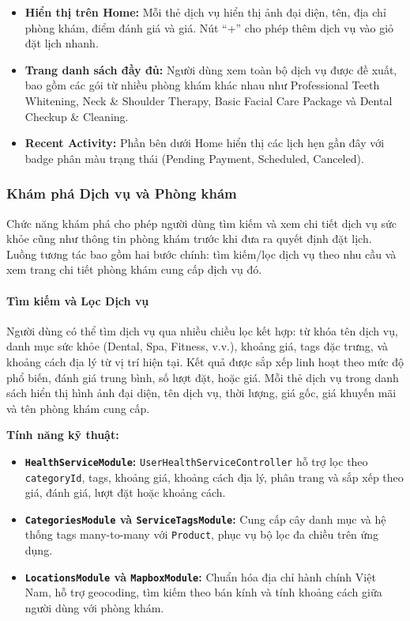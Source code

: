 \begin{itemize}
    \item \textbf{Hiển thị trên Home:} Mỗi thẻ dịch vụ hiển thị ảnh đại diện, tên, địa chỉ phòng khám, điểm đánh giá và giá. Nút ``+'' cho phép thêm dịch vụ vào giỏ đặt lịch nhanh.
    \item \textbf{Trang danh sách đầy đủ:} Người dùng xem toàn bộ dịch vụ được đề xuất, bao gồm các gói từ nhiều phòng khám khác nhau như Professional Teeth Whitening, Neck \& Shoulder Therapy, Basic Facial Care Package và Dental Checkup \& Cleaning.
    \item \textbf{Recent Activity:} Phần bên dưới Home hiển thị các lịch hẹn gần đây với badge phân màu trạng thái (Pending Payment, Scheduled, Canceled).
\end{itemize}

\subsubsection{Khám phá Dịch vụ và Phòng khám}

Chức năng khám phá cho phép người dùng tìm kiếm và xem chi tiết dịch vụ sức khỏe cũng như thông tin phòng khám trước khi đưa ra quyết định đặt lịch. Luồng tương tác bao gồm hai bước chính: tìm kiếm/lọc dịch vụ theo nhu cầu và xem trang chi tiết phòng khám cung cấp dịch vụ đó.

\paragraph{Tìm kiếm và Lọc Dịch vụ}

Người dùng có thể tìm dịch vụ qua nhiều chiều lọc kết hợp: từ khóa tên dịch vụ, danh mục sức khỏe (Dental, Spa, Fitness, v.v.), khoảng giá, tags đặc trưng, và khoảng cách địa lý từ vị trí hiện tại. Kết quả được sắp xếp linh hoạt theo mức độ phổ biến, đánh giá trung bình, số lượt đặt, hoặc giá. Mỗi thẻ dịch vụ trong danh sách hiển thị hình ảnh đại diện, tên dịch vụ, thời lượng, giá gốc, giá khuyến mãi và tên phòng khám cung cấp.

\textbf{Tính năng kỹ thuật:}

\begin{itemize}
    \item \textbf{\texttt{HealthServiceModule}:} \texttt{UserHealthServiceController} hỗ trợ lọc theo \texttt{categoryId}, tags, khoảng giá, khoảng cách địa lý, phân trang và sắp xếp theo giá, đánh giá, lượt đặt hoặc khoảng cách.
    \item \textbf{\texttt{CategoriesModule} và \texttt{ServiceTagsModule}:} Cung cấp cây danh mục và hệ thống tags many-to-many với \texttt{Product}, phục vụ bộ lọc đa chiều trên ứng dụng.
    \item \textbf{\texttt{LocationsModule} và \texttt{MapboxModule}:} Chuẩn hóa địa chỉ hành chính Việt Nam, hỗ trợ geocoding, tìm kiếm theo bán kính và tính khoảng cách giữa người dùng với phòng khám.
\end{itemize}

